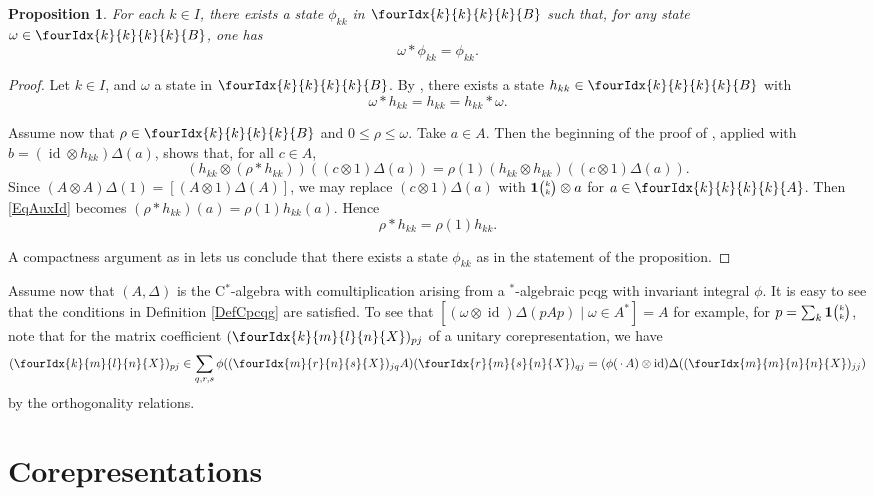 \documentclass[11pt]{article}
\DeclareMathOperator{\id}{id}
\newcommand{\Grt}[3]{#1{\tiny {\begin{pmatrix} #2\\#3\end{pmatrix}}}}
\newcommand{\UnitC}[2]{\Grt{\mathbf{1}}{#1}{#2}}
\newcommand{\Gr}[5]{\fourIdx{#2}{#4}{#3}{#5}{#1}}%
\newtheorem{Prop}[Theorem]{Proposition}
\theoremstyle{definition}
\numberwithin{equation}{section}
\begin{document}
\begin{Prop} For each $k\in I$, there exists a state $\phi_{kk}$ in $\Gr{B}{k}{k}{k}{k}$ such that, for any state $\omega \in \Gr{B}{k}{k}{k}{k}$, one has \[\omega*\phi_{kk} =\phi_{kk}.\]
\end{Prop} 
\begin{proof} Let $k\in I$, and $\omega$ a state in $\Gr{B}{k}{k}{k}{k}$. By \cite[Lemma 4.2]{MVD1},
  there exists a state $h_{kk} \in \Gr{B}{k}{k}{k}{k}$ with \[\omega *h_{kk}= h_{kk} =
  h_{kk}*\omega.\]

  Assume now that $\rho\in \Gr{B}{k}{k}{k}{k}$ and $0\leq \rho\leq \omega$. Take $a\in A$. Then the
  beginning of the proof of \cite[Lemma 4.3]{MVD1}, applied with $b= (\id\otimes h_{kk})\Delta(a)$,
  shows that, for all $c\in A$, 
  \begin{equation}\label{EqAuxId} (h_{kk}\otimes
    (\rho*h_{kk}))((c\otimes 1)\Delta(a)) = \rho(1) (h_{kk}\otimes h_{kk})((c\otimes
    1)\Delta(a)).\end{equation} Since $(A\otimes A)\Delta(1) = [(A\otimes 1)\Delta(A)]$, we may
  replace $(c\otimes 1)\Delta(a)$ with $\UnitC{k}{k}\otimes a$ for $a\in \Gr{A}{k}{k}{k}{k}$. Then
  \eqref{EqAuxId} becomes $(\rho*h_{kk})(a) = \rho(1)h_{kk}(a)$. Hence \[\rho*h_{kk} =
  \rho(1)h_{kk}.\]

A compactness argument as in \cite[Theorem 4.4]{MVD1} lets us conclude that there exists a state $\phi_{kk}$ as in the statement of the proposition.
\end{proof}


  Assume now that $(A,\Delta)$ is the C$^*$-algebra with comultiplication arising from a $^*$-algebraic pcqg with invariant integral $\phi$. It is easy to see that the conditions in Definition \ref{DefCpcqg} are satisfied. To see that $[(\omega\otimes \id)\Delta(pAp)\mid \omega \in A^*] = A$ for example, for $p = \sum_{k} \UnitC{k}{k}$, note that for the matrix coefficient $(\Gr{X}{k}{l}{m}{n})_{pj}$ of a unitary corepresentation, we have \[ (\Gr{X}{k}{l}{m}{n})_{pj} \in \sum_{q,r,s} \phi((\Gr{X}{m}{n}{r}{s})_{jq}A) (\Gr{X}{r}{s}{m}{n})_{qj} =(\phi(\,\cdot\, A)\otimes \id)\Delta((\Gr{X}{m}{n}{m}{n})_{jj})\] by the orthogonality relations. 




\section{Corepresentations}
\end{document}
